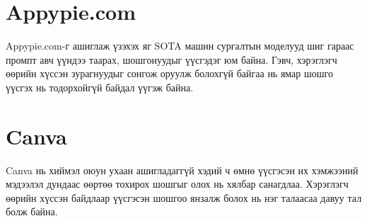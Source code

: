 \section{Appypie.com}
\quad \quad	Appypie.com-г ашиглаж үзэхэх яг SOTA машин сургалтын моделууд шиг гараас промпт авч  үүндээ таарах, шошгонуудыг үүсгэдэг юм байна. Гэвч, хэрэглэгч өөрийн хүссэн зурагнуудыг сонгож оруулж болохгүй байгаа нь ямар шошго үүсгэх нь тодорхойгүй байдал үүгэж байна.

\section{Canva}
\quad \quad	Canva нь хиймэл оюун ухаан ашигладаггүй хэдий ч өмнө үүсгэсэн их хэмжээний мэдээлэл дундаас өөртөө тохирох шошгыг олох нь хялбар санагдлаа. Хэрэглэгч өөрийн хүссэн байдлаар үүсгэсэн шошгоо янзалж болох нь нэг талаасаа давуу тал болж байна.

